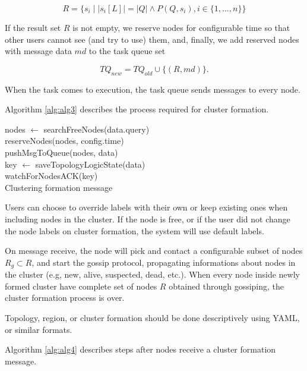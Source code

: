 \begin{equation}\label{frm:query_rule}  
	R=\{ s_i \;|\; \left|s_i[L]\right|=\left|Q\right| \wedge P(Q, s_i),i\in\{1, \ldots, n\}\}
\end{equation} 

\noindent
If the result set $R$ is not empty, we reserve nodes for configurable time so that other users cannot see (and try to use) them, and, finally, 
we add reserved nodes with message data $\mathit{md}$ to the task queue set 

\begin{equation}
	TQ_\mathit{new} =TQ_\mathit{old}\cup \{(R, md)\}.
\end{equation}

\noindent 
When the task comes to execution, the task queue sends messages to every node. 

Algorithm \ref{alg:alg3} describes the process required for cluster formation. 

\begin{algorithm}[H]
	\SetAlgoLined
	nodes $\leftarrow$ searchFreeNodes(data.query)\\
	reserveNodes(nodes, config.time)\\
	pushMsgToQueue(nodes, data)\\
	key $\leftarrow$ saveTopologyLogicState(data)\\
	watchForNodesACK(key)\\
	\caption{Clustering formation message}
	\label{alg:alg3}
\end{algorithm}

Users can choose to override labels with their own or keep existing ones when including nodes in the cluster. If the node is free, or if the user did not change the node labels on cluster formation, the system will use default labels.  

On message receive, the node will pick and contact a configurable subset of nodes $R_g \subset R$, and start the gossip protocol, propagating informations about nodes in the cluster (e.g, new, alive, suspected, dead, etc.). When every node inside newly formed cluster have complete set of nodes $R$ obtained through gossiping, the cluster formation process is over. 

Topology, region, or cluster formation should be done descriptively using YAML, or similar formats. 

Algorithm \ref{alg:alg4} describes steps after nodes receive a cluster formation message.

